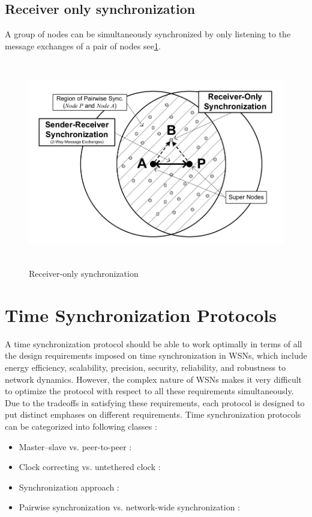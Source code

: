     \subsection{Receiver only synchronization}
	    A group of nodes can be simultaneously synchronized by only listening to the message exchanges of a pair of nodes\cite{book} see\ref{fig:x Receiver_Only}.
	    \begin{figure}[h!]
	    	\centering
	    	\includegraphics[scale=0.5,width=15cm,height=9cm]{photos/reciverOnly.png}
	    	\caption{Receiver-only synchronization}
	    	\label{fig:x Receiver_Only}
	    	
	    \end{figure}
	    
    
    
    
\section{Time Synchronization Protocols}
A time synchronization protocol should be able to work optimally in terms of all the design requirements imposed on time synchronization in WSNs\cite{book}, which include energy efficiency, scalability, precision, security, reliability, and robustness to network dynamics. However, the complex nature of WSNs makes it very difficult to optimize the protocol with respect to all these requirements simultaneously\cite{book}. Due to the tradeoffs in satisfying these requirements, each protocol is designed to put distinct emphases on different requirements\cite{book}.
\newline Time synchronization protocols can be categorized into following classes :\cite{book}
\begin{itemize}
	\item Master–slave vs. peer-to-peer : 
	\item Clock correcting vs. untethered clock :
	\item Synchronization approach : 
	\item Pairwise synchronization vs. network-wide synchronization :
\end{itemize}


